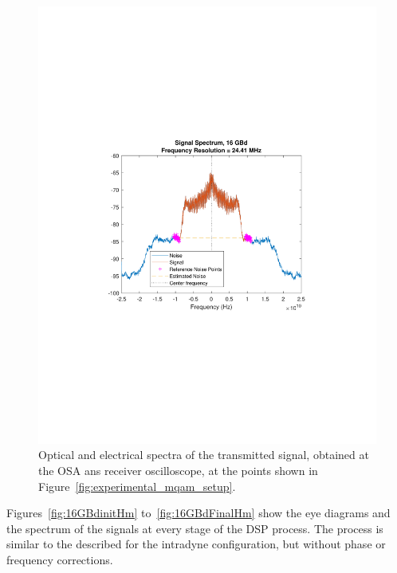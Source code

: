 \begin{refsection}
\begin{figure}[H]
\begin{minipage}{0.43\textwidth}
		\includegraphics[clip, trim=4cm 8cm 4cm 8cm, width=1\textwidth]{./sdf/m_qam_system/figures/expResults/homodyne/16GBdSpectrum.pdf}
		\caption{}
		\label{fig:16GBdSpectHm}
	\end{minipage}
	\caption{Optical and electrical spectra of the transmitted signal, obtained at the OSA ans receiver oscilloscope, at the points shown in Figure~\ref{fig:experimental_mqam_setup}.}
\end{figure}



Figures~\ref{fig:16GBdinitHm} to~\ref{fig:16GBdFinalHm} show the eye diagrams and the spectrum of the signals at every stage of the DSP process. The process is similar to the described for the intradyne configuration, but without phase or frequency corrections.



\end{refsection}
